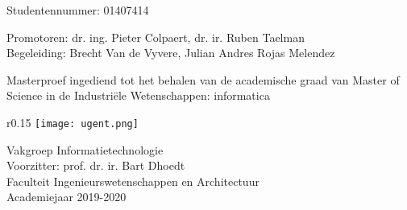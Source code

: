 \begin{titlepage}
{\ugentfont

  \vspace*{0.37\textheight}

  \begin{huge}

    \thetitle

    \theauthor
    

  \end{huge}
  Studentennummer: 01407414

  \vspace{1.8cm}

  \begin{Large}
    Promotoren: dr. ing. Pieter Colpaert, dr. ir. Ruben Taelman\\
    Begeleiding: Brecht Van de Vyvere, Julian Andres Rojas Melendez

    Masterproef ingediend tot het behalen van de academische graad van Master of Science in de Industriële Wetenschappen: informatica
  \end{Large}

  \vspace{1cm}

  \begin{Large}
    \begin{wrapfigure}{r}{0.15\textwidth}
      \texttt{[image: ugent.png]}
    \end{wrapfigure}

    Vakgroep Informatietechnologie\\
    Voorzitter: prof. dr. ir. Bart Dhoedt\\
    Faculteit Ingenieurswetenschappen en Architectuur\\
    Academiejaar 2019-2020
  \end{Large}
}
\end{titlepage}
